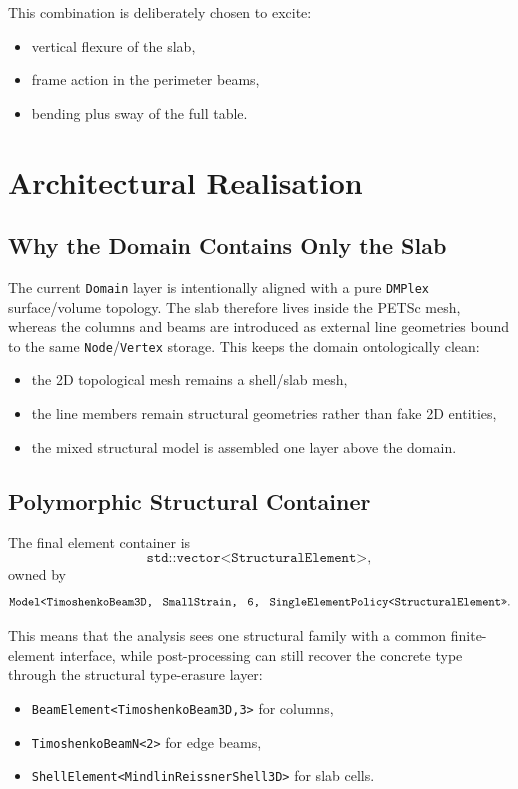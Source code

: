 This combination is deliberately chosen to excite:
\begin{itemize}
  \item vertical flexure of the slab,
  \item frame action in the perimeter beams,
  \item bending plus sway of the full table.
\end{itemize}

\section{Architectural Realisation}

\subsection{Why the Domain Contains Only the Slab}

The current \texttt{Domain} layer is intentionally aligned with a pure
\texttt{DMPlex} surface/volume topology.  The slab therefore lives inside the
PETSc mesh, whereas the columns and beams are introduced as external line
geometries bound to the same \texttt{Node}/\texttt{Vertex} storage.  This
keeps the domain ontologically clean:
\begin{itemize}
  \item the 2D topological mesh remains a shell/slab mesh,
  \item the line members remain structural geometries rather than fake 2D
        entities,
  \item the mixed structural model is assembled one layer above the domain.
\end{itemize}

\subsection{Polymorphic Structural Container}

The final element container is
\[
\texttt{std::vector<StructuralElement>},
\]
owned by
\[
\texttt{Model<TimoshenkoBeam3D,\; SmallStrain,\; 6,\; SingleElementPolicy<StructuralElement>>}.
\]

This means that the analysis sees one structural family with a common
finite-element interface, while post-processing can still recover the concrete
type through the structural type-erasure layer:
\begin{itemize}
  \item \texttt{BeamElement<TimoshenkoBeam3D,3>} for columns,
  \item \texttt{TimoshenkoBeamN<2>} for edge beams,
  \item \texttt{ShellElement<MindlinReissnerShell3D>} for slab cells.
\end{itemize}

